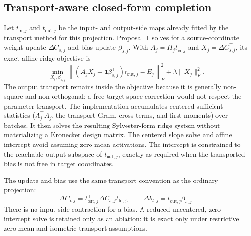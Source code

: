\documentclass[10pt]{article}
\begin{document}
\subsection{Transport-aware closed-form completion}
Let $t_{\mathrm{in},j}$ and $t_{\mathrm{out},j}$ be the input- and output-side maps already fitted by the transport method for this projection. Proposal~1 solves for a source-coordinate weight update $\Delta C_{s,j}$ and bias update $\beta_{s,j}$. With $A_j=H_jt_{\mathrm{in},j}^{\top}$ and $X_j=\Delta C_{s,j}^{\top}$, its exact affine ridge objective is
\begin{equation}
 \min_{X_j,\beta_{s,j}}
 \left\|\left(A_jX_j+\mathbf{1}\beta_{s,j}^{\top}\right)t_{\mathrm{out},j}-E_j\right\|_F^2
 +\lambda\|X_j\|_F^2.
 \label{eq:completion}
\end{equation}
The output transport remains inside the objective because it is generally non-square and non-orthogonal; a free target-space correction would not respect the parameter transport. The implementation accumulates centered sufficient statistics ($A_j^\top A_j$, the transport Gram, cross terms, and first moments) over batches. It then solves the resulting Sylvester-form ridge system without materializing a Kronecker design matrix. The centered slope solve and affine intercept avoid assuming zero-mean activations. The intercept is constrained to the reachable output subspace of $t_{\mathrm{out},j}$, exactly as required when the transported bias is not free in target coordinates.

The update and bias use the same transport convention as the ordinary projection:
\begin{equation}
 \Delta C_{t,j}=t_{\mathrm{out},j}^{\top}\Delta C_{s,j}t_{\mathrm{in},j},
 \qquad \Delta b_{t,j}=t_{\mathrm{out},j}^{\top}\beta_{s,j}.
\end{equation}
There is no input-side contraction for a bias. A reduced uncentered, zero-intercept solve is retained only as an ablation: it is exact only under restrictive zero-mean and isometric-transport assumptions.
\end{document}
